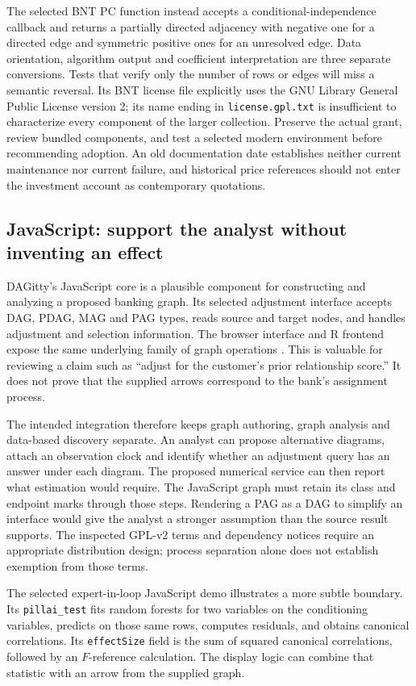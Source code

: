 The selected BNT PC function instead accepts a conditional-independence
callback and returns a partially directed adjacency with negative one for
a directed edge and symmetric positive ones for an unresolved edge.
Data orientation, algorithm output and coefficient interpretation are three
separate conversions. Tests that verify only the number of rows or edges
will miss a semantic reversal. Its BNT license file explicitly uses the GNU
Library General Public License version 2; its name ending in
\texttt{license.gpl.txt} is insufficient to characterize every component of
the larger collection. Preserve the actual grant, review bundled components,
and test a selected modern environment before recommending adoption.
An old documentation date establishes neither current maintenance nor
current failure, and historical price references should not enter the
investment account as contemporary quotations.

\subsection{JavaScript: support the analyst without inventing an effect}

DAGitty's JavaScript core is a plausible component for constructing and
analyzing a proposed banking graph. Its selected adjustment interface
accepts DAG, PDAG, MAG and PAG types, reads source and target nodes, and
handles adjustment and selection information. The browser interface and R
frontend expose the same underlying family of graph operations
\citep{exec13_other_dagitty}. This is valuable for reviewing a claim such as
``adjust for the customer's prior relationship score.'' It does not prove
that the supplied arrows correspond to the bank's assignment process.

The intended integration therefore keeps graph authoring, graph analysis
and data-based discovery separate. An analyst can propose alternative
diagrams, attach an observation clock and identify whether an adjustment
query has an answer under each diagram. The proposed numerical service can
then report what estimation would require. The JavaScript graph must retain
its class and endpoint marks through those steps. Rendering a PAG as a DAG
to simplify an interface would give the analyst a stronger assumption than
the source result supports. The inspected GPL-v2 terms and dependency
notices require an appropriate distribution design; process separation
alone does not establish exemption from those terms.

The selected expert-in-loop JavaScript demo illustrates a more subtle
boundary. Its \texttt{pillai\_test} fits random forests for two variables on
the conditioning variables, predicts on those same rows, computes residuals,
and obtains canonical correlations. Its \texttt{effectSize} field is the
sum of squared canonical correlations, followed by an $F$-reference
calculation. The display logic can combine that statistic with an arrow from
the supplied graph\citep{exec13_other_webapp}.

